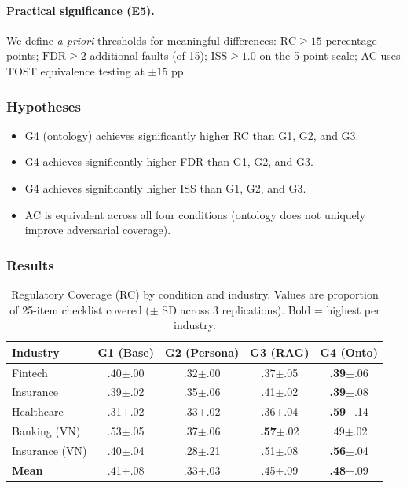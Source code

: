 \documentclass[11pt,a4paper]{article}
\begin{document}
\paragraph{Practical significance (E5).}
We define \emph{a priori} thresholds for meaningful differences:
$\text{RC} \geq 15$ percentage points;
$\text{FDR} \geq 2$ additional faults (of 15);
$\text{ISS} \geq 1.0$ on the 5-point scale;
AC uses TOST equivalence testing at $\pm 15$ pp.

\subsubsection{Hypotheses}

\begin{itemize}
  \item[\textbf{H1}] G4 (ontology) achieves significantly higher RC
    than G1, G2, and G3.
  \item[\textbf{H2}] G4 achieves significantly higher FDR than G1, G2,
    and G3.
  \item[\textbf{H3}] G4 achieves significantly higher ISS than G1, G2,
    and G3.
  \item[\textbf{H4}] AC is equivalent across all four conditions
    (ontology does not uniquely improve adversarial coverage).
\end{itemize}

\subsubsection{Results}
\label{sec:results}


\begin{table}[htbp]
\centering
\caption{Regulatory Coverage (RC) by condition and industry.
  Values are proportion of 25-item checklist covered ($\pm$ SD across
  3 replications). Bold = highest per industry.}
\label{tab:rc-results}
\begin{tabular}{@{}lcccc@{}}
\toprule
\textbf{Industry} & \textbf{G1 (Base)} & \textbf{G2 (Persona)} &
  \textbf{G3 (RAG)} & \textbf{G4 (Onto)} \\
\midrule
Fintech       & .40$\pm$.00 & .32$\pm$.00 & .37$\pm$.05 & \textbf{.39}$\pm$.06 \\
Insurance     & .39$\pm$.02 & .35$\pm$.06 & .41$\pm$.02 & \textbf{.39}$\pm$.08 \\
Healthcare    & .31$\pm$.02 & .33$\pm$.02 & .36$\pm$.04 & \textbf{.59}$\pm$.14 \\
Banking (VN)  & .53$\pm$.05 & .37$\pm$.06 & \textbf{.57}$\pm$.02 & .49$\pm$.02 \\
Insurance (VN)& .40$\pm$.04 & .28$\pm$.21 & .51$\pm$.08 & \textbf{.56}$\pm$.04 \\
\midrule
\textbf{Mean} & .41$\pm$.08 & .33$\pm$.03 & .45$\pm$.09 & \textbf{.48}$\pm$.09 \\
\bottomrule
\end{tabular}
\end{table}
\end{document}
